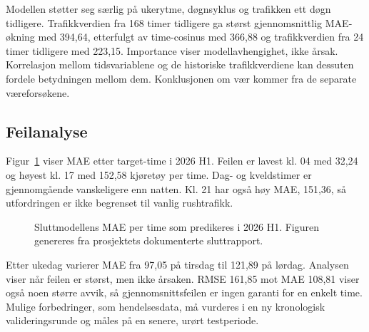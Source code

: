Modellen støtter seg særlig på ukerytme, døgnsyklus og trafikken ett døgn tidligere.
Trafikkverdien fra 168 timer tidligere ga størst gjennomsnittlig MAE-økning med
394,64, etterfulgt av time-cosinus med 366,88 og trafikkverdien fra 24 timer
tidligere med 223,15. Importance viser modellavhengighet, ikke årsak. Korrelasjon
mellom tidsvariablene og de historiske trafikkverdiene kan dessuten fordele
betydningen mellom dem. Konklusjonen om vær kommer fra de separate væreforsøkene.

\subsection{Feilanalyse}

Figur~\ref{fig:hourly-error} viser MAE etter target-time i 2026 H1. Feilen er lavest
kl. 04 med 32,24 og høyest kl. 17 med 152,58 kjøretøy per time. Dag- og kveldstimer
er gjennomgående vanskeligere enn natten. Kl. 21 har også høy MAE, 151,36, så
utfordringen er ikke begrenset til vanlig rushtrafikk.

\begin{figure}[htbp]
  \centering
  \caption{Sluttmodellens MAE per time som predikeres i 2026 H1. Figuren genereres fra
  prosjektets dokumenterte sluttrapport.}
  \label{fig:hourly-error}
\end{figure}

Etter ukedag varierer MAE fra 97,05 på tirsdag til 121,89 på lørdag. Analysen viser
når feilen er størst, men ikke årsaken. RMSE 161,85 mot MAE 108,81 viser også noen
større avvik, så gjennomsnittsfeilen er ingen garanti for en enkelt time. Mulige
forbedringer, som hendelsesdata, må vurderes i en ny kronologisk valideringsrunde og
måles på en senere, urørt testperiode.
